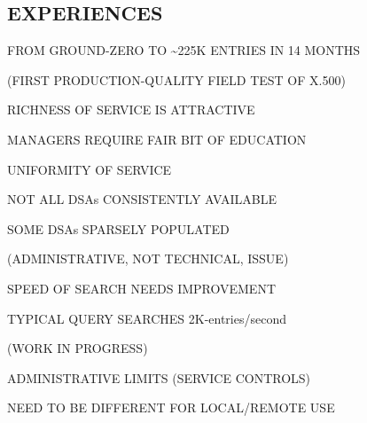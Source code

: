 \begin{bwslide}
\part*	{EXPERIENCES}

\begin{nrtc}
\item	FROM GROUND-ZERO TO \~{}225K ENTRIES IN 14 MONTHS
    \begin{nrtc}
    \item	(FIRST PRODUCTION-QUALITY FIELD TEST OF X.500)
    \end{nrtc}

\item	RICHNESS OF SERVICE IS ATTRACTIVE

\item	MANAGERS REQUIRE FAIR BIT OF EDUCATION
\end{nrtc}
\end{bwslide}


\begin{bwslide}

\begin{nrtc}
\item	UNIFORMITY OF SERVICE
    \begin{nrtc}
    \item	NOT ALL DSAs CONSISTENTLY AVAILABLE

    \item	SOME DSAs SPARSELY POPULATED
    \end{nrtc}
    (ADMINISTRATIVE, NOT TECHNICAL, ISSUE)

\item	SPEED OF SEARCH NEEDS IMPROVEMENT
    \begin{nrtc}
    \item	TYPICAL QUERY SEARCHES 2K-entries/second
    \end{nrtc}
    (WORK IN PROGRESS)

\item	ADMINISTRATIVE LIMITS (SERVICE CONTROLS)
    \begin{nrtc}
    \item	NEED TO BE DIFFERENT FOR LOCAL/REMOTE USE
    \end{nrtc}
\end{nrtc}
\end{bwslide}


